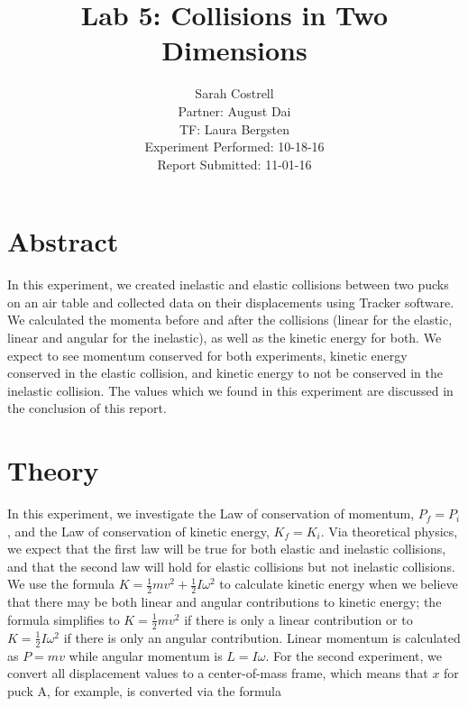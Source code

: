 \documentclass[11pt]{article}
\begin{document}
%
\author{Sarah Costrell\\Partner: August Dai\\TF: Laura Bergsten\\Experiment Performed: 10-18-16\\Report Submitted: 11-01-16}
\title{Lab 5: Collisions in Two Dimensions}
\date{}
\maketitle


\section{Abstract}

In this experiment, we created inelastic and elastic collisions between two pucks on an air table and collected data on their displacements using Tracker software. We calculated the momenta before and after the collisions (linear for the elastic, linear and angular for the inelastic), as well as the kinetic energy for both. We expect to see momentum conserved for both experiments, kinetic energy conserved in the elastic collision, and kinetic energy to not be conserved in the inelastic collision. The values which we found in this experiment are discussed in the conclusion of this report.

\section{Theory}
In this experiment, we investigate the Law of conservation of momentum, $P_f=P_i$, and the Law of conservation of kinetic energy, $K_f=K_i$. Via theoretical physics, we expect that the first law will be true for both elastic and inelastic collisions, and that the second law will hold for elastic collisions but not inelastic collisions. We use the formula $K=\frac{1}{2}mv^2+\frac{1}{2}I\omega^2$ to calculate kinetic energy when we believe that there may be both linear and angular contributions to kinetic energy; the formula simplifies to $K=\frac{1}{2}mv^2$ if there is only a linear contribution or to $K=\frac{1}{2}I\omega^2$ if there is only an angular contribution. Linear momentum is calculated as $P=mv$ while angular momentum is $L=I\omega$. For the second experiment, we convert all displacement values to a center-of-mass frame, which means that $x$ for puck A, for example, is converted via the formula
\end{document}
